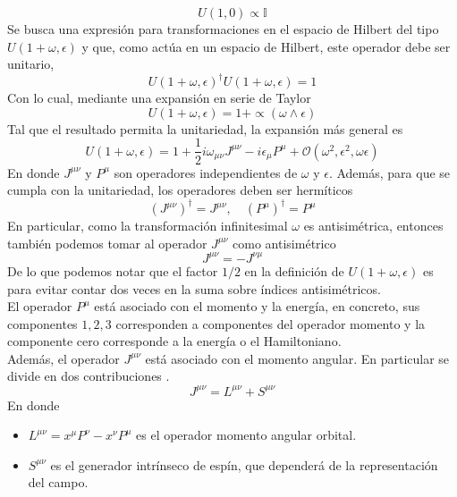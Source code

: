 \documentclass[12pt,letterpaper]{article}
\begin{document}
\begin{equation}
  U(1,0)\propto \mathbb{{I}} 
\end{equation}
Se busca una expresión para transformaciones en el espacio de Hilbert del tipo $U(1+\omega,\epsilon)$ y que, como actúa en un espacio de Hilbert, este operador debe ser unitario,
\begin{equation}
  U(1+\omega,\epsilon)^{\dagger}U(1+\omega,\epsilon) = 1
\end{equation}
Con lo cual, mediante una expansión en serie de Taylor \cite{weinberg-v1}
\begin{equation}
  U(1+\omega,\epsilon) = 1 + \propto \left( \omega \wedge \epsilon \right)
\end{equation}
Tal que el resultado permita la unitariedad, la expansión más general es
\begin{equation}
 U(1+\omega,\epsilon) = 1 + \frac{1}{2}i\omega_{\mu\nu} J^{\mu\nu} - i\epsilon_\mu P^\mu + \mathcal{O}(\omega^2,\epsilon^2,\omega \epsilon)
\end{equation}
En donde $J^{\mu\nu}$ y $P^\mu$ son operadores independientes de $\omega$ y $\epsilon$. Además, para que se cumpla con la unitariedad, los operadores deben ser hermíticos 
\begin{equation}
  \left( J^{\mu\nu} \right)^\dagger = J^{\mu\nu},\quad \left( P^\mu \right)^\dagger = P^\mu
\end{equation}
En particular, como la transformación infinitesimal $\omega$ es antisimétrica, entonces también podemos tomar al operador $J^{\mu\nu}$ como antisimétrico
\begin{equation}
  J^{\mu\nu} = -J^{\nu\mu}
\end{equation}
De lo que podemos notar que el factor $1/2$ en la definición de $U(1+\omega,\epsilon)$ es para evitar contar dos veces en la suma sobre índices antisimétricos. 
\\
El operador $P^\mu$ está asociado con el momento y la energía, en concreto, sus componentes $1,2,3$ corresponden a componentes del operador momento y la componente cero corresponde a la energía o el Hamiltoniano. \\
Además, el operador $J^{\mu\nu}$ está asociado con el momento angular. En particular se divide en dos contribuciones \cite{apunte}.
\begin{equation}
  J^{\mu\nu} = L^{\mu\nu} + S^{\mu\nu}
\end{equation}
En donde
\begin{itemize}
  \item $L^{\mu\nu}=x^\mu P^\nu - x^\nu P^\mu$ es el operador momento angular orbital.
  \item $S^{\mu\nu}$ es el generador intrínseco de espín, que dependerá de la representación del campo. 
\end{itemize}
\end{document}
